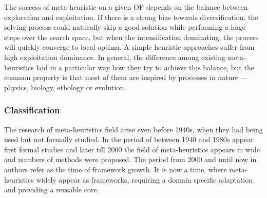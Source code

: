 The success of meta-heuristic on a given OP depends on the balance between exploration and exploitation. If there is a strong bias towards diversification, the solving process could naturally skip a good solution while performing a huge steps over the search space, but when the intensification dominating, the process will quickly converge to local optima. A simple heuristic approaches suffer from high exploitation dominance. 
In general, the difference among existing meta-heuristics laid in a particular way how they try to achieve this balance, but the common property is that most of them are inspired by processes in nature — physics, biology, ethology or evolution.


\subsubsection{Classification}
The research of meta-heuristics field arise even before 1940s, when they had being used but not formally studied. In the period of between 1940 and 1980s appear first formal studies and later till 2000 the field of meta-heuristics appears in wide and numbers of methods were proposed. The period from 2000 and until now in \cite{sorensen2017history} authors refer as the time of framework growth. It is now a time, where meta-heuristics widely appear as frameworks, requiring a domain specific adaptation and providing a reusable core. 

